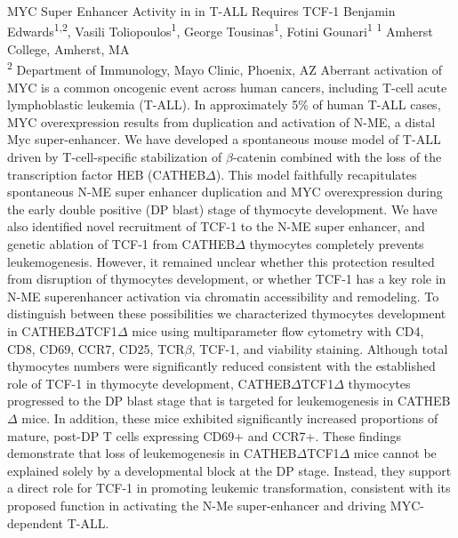 \makeabstract
    {
    MYC Super Enhancer Activity in in T-ALL Requires TCF-1
    }
    {
    Benjamin Edwards\textsuperscript{1,2}, Vasili Toliopoulos\textsuperscript{1}, George Tousinas\textsuperscript{1}, Fotini Gounari\textsuperscript{1}
    }
    {
    \textsuperscript{1} Amherst College, Amherst, MA\\
\textsuperscript{2} Department of Immunology, Mayo Clinic, Phoenix, AZ
    }
    {
    Aberrant activation of MYC is a common oncogenic event across human cancers, including T-cell acute lymphoblastic leukemia (T-ALL). In approximately 5\% of human T-ALL cases, MYC overexpression results from duplication and activation of N-ME, a distal Myc super-enhancer. We have developed a spontaneous mouse model of T-ALL driven by T-cell-specific stabilization of \ensuremath{\beta}-catenin combined with the loss of the transcription factor HEB (CATHEB\ensuremath{\Delta}). This model faithfully recapitulates spontaneous N-ME super enhancer duplication and MYC overexpression during the early double positive (DP blast) stage of thymocyte development. We have also identified novel recruitment of TCF-1 to the N-ME super enhancer, and genetic ablation of TCF-1 from CATHEB\ensuremath{\Delta} thymocytes completely prevents leukemogenesis. However, it remained unclear whether this protection resulted from disruption of thymocytes development, or whether TCF-1 has a key role in N-ME superenhancer activation via chromatin accessibility and remodeling.
    }
    {
    To distinguish between these possibilities we characterized thymocytes development in CATHEB\ensuremath{\Delta}TCF1\ensuremath{\Delta} mice using multiparameter flow cytometry with CD4, CD8, CD69, CCR7, CD25, TCR\ensuremath{\beta}, TCF-1, and viability staining. 
    }
    {
    Although total thymocytes numbers were significantly reduced consistent with the established role of TCF-1 in thymocyte development, CATHEB\ensuremath{\Delta}TCF1\ensuremath{\Delta} thymocytes progressed to the DP blast stage that is targeted for leukemogenesis in CATHEB\ensuremath{\Delta} mice. In addition, these mice exhibited significantly increased proportions of mature, post-DP T cells expressing CD69+ and CCR7+.
    }
    {
    These findings demonstrate that loss of leukemogenesis in CATHEB\ensuremath{\Delta}TCF1\ensuremath{\Delta} mice cannot be explained solely by a developmental block at the DP stage. Instead, they support a direct role for TCF-1 in promoting leukemic transformation, consistent with its proposed function in activating the N-Me super-enhancer and driving MYC-dependent T-ALL.
    }

    \newpage
    